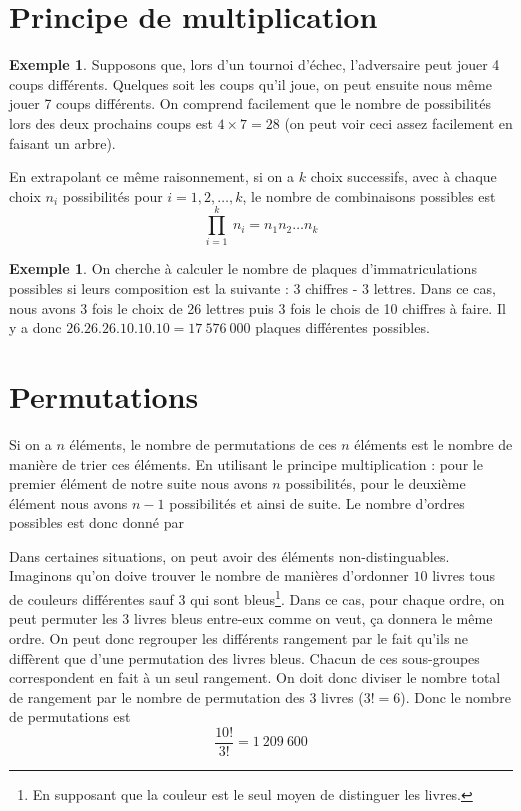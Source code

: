 \documentclass[a4paper,12pt]{report}
\theoremstyle{definition}
\renewcommand{\(}{\left(}
\renewcommand{\)}{\right)}
\newtheorem{exmp}[thm]{Exemple}
\begin{document}
    \section{Principe de multiplication}
    
        \begin{exmp}
            Supposons que, lors d'un tournoi d'échec, l'adversaire peut jouer 4 coups différents. Quelques soit les coups qu'il joue, on peut ensuite nous même jouer 7 coups différents. On comprend facilement que le nombre de possibilités lors des deux prochains coups est $4\times7 = 28$ (on peut voir ceci assez facilement en faisant un arbre).
        \end{exmp}
        
        En extrapolant ce même raisonnement, si on a $k$ choix successifs, avec à chaque choix $n_i$ possibilités pour $i=1,2,\dots,k$, le nombre de combinaisons possibles est 
        $$\prod_{i=1}^k~n_i = n_1n_2\dots n_k$$
        
        \begin{exmp}
            On cherche à calculer le nombre de plaques d'immatriculations possibles si leurs composition est la suivante : 3 chiffres - 3 lettres. Dans ce cas, nous avons 3 fois le choix de 26 lettres puis 3 fois le chois de 10 chiffres à faire. Il y a donc $26.26.26.10.10.10 = 17~576~000$ plaques différentes possibles.
        \end{exmp}
    
    \section{Permutations}
    
        Si on a $n$ éléments, le nombre de permutations de ces $n$ éléments est le nombre de manière de trier ces éléments. En utilisant le principe multiplication :  pour le premier élément de notre suite nous avons $n$ possibilités, pour le deuxième élément nous avons $n-1$ possibilités et ainsi de suite. Le nombre d'ordres possibles est donc donné par
        
        \begin{center}
            \setlength{\fboxrule}{1pt}
        \end{center}
        
        Dans certaines situations, on peut avoir des éléments non-distinguables. Imaginons qu'on doive trouver le nombre de manières d'ordonner $10$ livres tous de couleurs différentes sauf $3$ qui sont bleus\footnote{En supposant que la couleur est le seul moyen de distinguer les livres.}. Dans ce cas, pour chaque ordre, on peut permuter les $3$ livres bleus entre-eux comme on veut, ça donnera le même ordre. On peut donc regrouper les différents rangement par le fait qu'ils ne diffèrent que d'une permutation des livres bleus. Chacun de ces sous-groupes correspondent en fait à un seul rangement. On doit donc diviser le nombre total de rangement par le nombre de permutation des $3$ livres ($3! = 6$). Donc le nombre de permutations est $$\frac{10!}{3!} = 1~209~600$$
        
\end{document}

